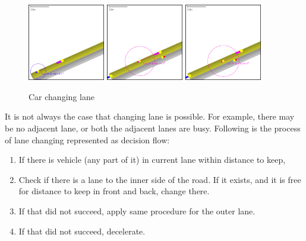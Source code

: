 \begin{figure}[!h]
    \vspace{1.5em}
    \caption{Car changing lane}
    \label{fig:carKeepingDistance}
    \centering
    \includegraphics[width=0.3\textwidth]{figs/carMovement/car_keeping_distance_to_other.png}
    \hspace{0.2em}
    \includegraphics[width=0.3\textwidth]{figs/carMovement/car_lane_change_before.png}
    \hspace{0.2em}
    \includegraphics[width=0.3\textwidth]{figs/carMovement/car_lane_change_after.png}
    \vspace{1.5em}
\end{figure}

It is not always the case that changing lane is possible. For example, there may be no adjacent lane, or both the adjacent lanes are busy. Following is the process of lane changing represented as decision flow:
\begin{enumerate}
    \item If there is vehicle (any part of it) in current lane within distance to keep,
    \item Check if there is a lane to the inner side of the road. If it exists, and it is free for distance to keep in front and back, change there.
    \item If that did not succeed, apply same procedure for the outer lane.
    \item If that did not succeed, decelerate.
\end{enumerate}

